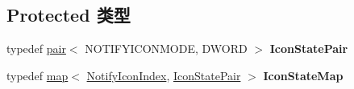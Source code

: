 \subsection*{Protected 类型}
\begin{DoxyCompactItemize}
\item 
\mbox{\label{struct_tray_notify_dlg_aa06d31c4b4b2a82c134c8c67cc3ccab2}} 
typedef \hyperlink{structpair}{pair}$<$ N\+O\+T\+I\+F\+Y\+I\+C\+O\+N\+M\+O\+DE, D\+W\+O\+RD $>$ {\bfseries Icon\+State\+Pair}
\item 
\mbox{\label{struct_tray_notify_dlg_aef6dd110a7b15fe6e961cbb3b69c00d6}} 
typedef \hyperlink{classmap}{map}$<$ \hyperlink{struct_notify_icon_index}{Notify\+Icon\+Index}, \hyperlink{structpair}{Icon\+State\+Pair} $>$ {\bfseries Icon\+State\+Map}
\end{DoxyCompactItemize}
